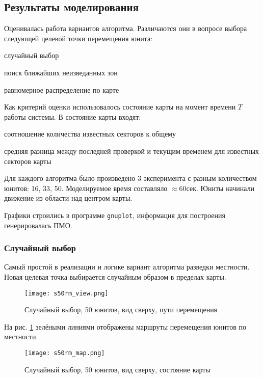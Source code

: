 \subsection{Результаты моделирования}

Оценивалась работа вариантов алгоритма. Различаются они в
вопросе выбора следующей целевой точки перемещения юнита:
\begin{mintemize}
\item случайный выбор
\item поиск ближайших неизведанных зон
\item равномерное распределение по карте
\end{mintemize}

Как критерий оценки использовалось состояние карты на момент
времени $T$ работы системы. В состояние карты входят:

\begin{mintemize}
\item соотношение количества известных секторов к общему
\item средняя разница между последней проверкой и текущим временем
    для известных секторов карты
\end{mintemize}

Для каждого алгоритма было произведено 3 эксперимента с разным
количеством юнитов: 16, 33, 50. Моделируемое время составляло
$\approx 60\text{сек}$. Юниты начинали движение из области над
центром карты.

Графики строились в программе \verb|gnuplot|, информация для
построения генерировалась ПМО.

\newpage
\subsubsection{Случайный выбор}

Самый простой в реализации и логике вариант алгоритма разведки
местности. Новая целевая точка выбирается случайным образом в
пределах карты.

\begin{figure}[h!]
    \centering
    \texttt{[image: s50rm\_view.png]}
    \caption{Случайный выбор, 50 юнитов, вид сверху, пути перемещения}
    \label{fig:s50rm_view}
\end{figure}

На рис. \ref{fig:s50rm_view} зелёными линиями отображены маршруты перемещения юнитов 
по местности.

\begin{figure}[h!]
    \centering
    \texttt{[image: s50rm\_map.png]}
    \caption{Случайный выбор, 50 юнитов, вид сверху, состояние карты}
    \label{fig:s50rm_map}
\end{figure}

